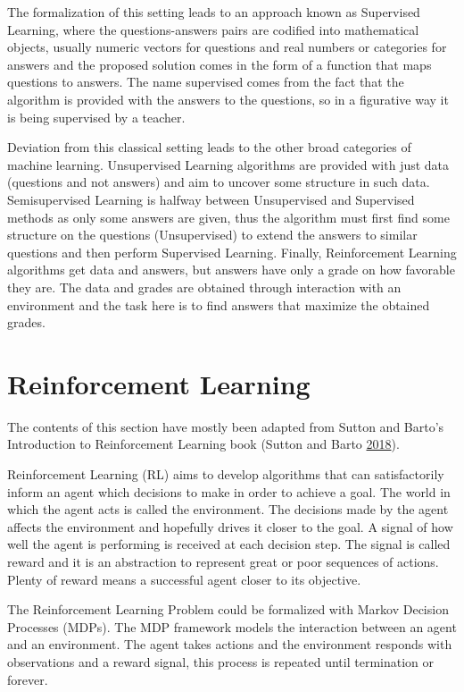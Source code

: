 \documentclass[
  openany]{book}
\begin{document}
The formalization of this setting leads to an approach known as Supervised Learning, where the questions-answers pairs are codified into mathematical objects, usually numeric vectors for questions and real numbers or categories for answers and the proposed solution comes in the form of a function that maps questions to answers. The name supervised comes from the fact that the algorithm is provided with the answers to the questions, so in a figurative way it is being supervised by a teacher.

Deviation from this classical setting leads to the other broad categories of machine learning. Unsupervised Learning algorithms are provided with just data (questions and not answers) and aim to uncover some structure in such data. Semisupervised Learning is halfway between Unsupervised and Supervised methods as only some answers are given, thus the algorithm must first find some structure on the questions (Unsupervised) to extend the answers to similar questions and then perform Supervised Learning. Finally, Reinforcement Learning algorithms get data and answers, but answers have only a grade on how favorable they are. The data and grades are obtained through interaction with an environment and the task here is to find answers that maximize the obtained grades.

\hypertarget{reinforcement-learning-1}{%
\section{Reinforcement Learning}\label{reinforcement-learning-1}}

The contents of this section have mostly been adapted from Sutton and Barto's Introduction to Reinforcement Learning book (Sutton and Barto \protect\hyperlink{ref-sutton2018reinforcement}{2018}).

Reinforcement Learning (RL) aims to develop algorithms that can satisfactorily inform an agent which decisions to make in order to achieve a goal. The world in which the agent acts is called the environment. The decisions made by the agent affects the environment and hopefully drives it closer to the goal. A signal of how well the agent is performing is received at each decision step. The signal is called reward and it is an abstraction to represent great or poor sequences of actions. Plenty of reward means a successful agent closer to its objective.

The Reinforcement Learning Problem could be formalized with Markov Decision Processes (MDPs). The MDP framework models the interaction between an agent and an environment. The agent takes actions and the environment responds with observations and a reward signal, this process is repeated until termination or forever.
\end{document}
